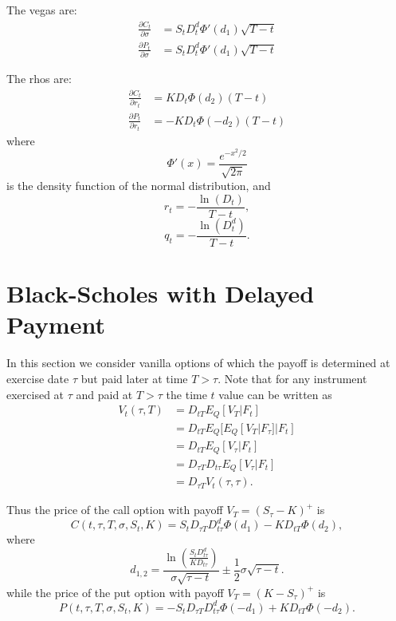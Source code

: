 The vegas are:
\begin{align}
	\frac{\partial C_t}{\partial \sigma} &= S_t D_t^d \Phi'(d_1) \sqrt{T-t}   \\
	\frac{\partial P_t}{\partial \sigma} &= S_t D_t^d \Phi'(d_1) \sqrt{T-t}
\end{align}

The rhos are:
\begin{align}
	\frac{\partial C_t}{\partial r_t} &= K D_t \Phi(d_2) (T-t)    \\
	\frac{\partial P_t}{\partial r_t} &= - K D_t \Phi(-d_2) (T-t)
\end{align}
where
\[
	\Phi'(x)=\frac{e^{-x^2/2}}{\sqrt{2\pi}}
\]
is the density function of the normal distribution,
and
\[
	r_t = -\frac{\ln(D_t)}{T-t},
\]
\[
	q_t = -\frac{\ln(D_t^d)}{T-t}.
\]


\section{Black-Scholes with Delayed Payment}
In this section we consider vanilla options of which the payoff is determined at
exercise date $\tau$ but paid later at time $T>\tau$.
Note that for any instrument exercised at $\tau$ and paid at $T>\tau$
the time $t$ value can be written as
\begin{align*}
	V_t(\tau,T) &= D_{tT} E_Q[V_T|F_t]    \\
				 &= D_{tT} E_Q[E_Q[V_T|F_{\tau}]|F_t]  \\
				 &= D_{tT} E_Q[V_{\tau}|F_t]  \\
				 &= D_{\tau T} D_{t\tau} E_Q[V_{\tau}|F_t]  \\
				 &= D_{\tau T} V_t(\tau,\tau).
\end{align*}

Thus the price of the call option with payoff $V_T=(S_{\tau}-K)^+$ is
\begin{equation} 
	C(t,\tau, T,\sigma,S_t,K) = S_t D_{\tau T} D_{t\tau}^d \Phi(d_1) - K D_{tT} \Phi(d_2),
\end{equation}
where
\[
	d_{1,2}=
  	\frac{\ln\left( \frac{S_t D_{t\tau}^d}{K D_{t\tau}}	\right)}{\sigma\sqrt{\tau-t}}
          \pm \frac{1}{2} \sigma\sqrt{\tau-t}.
\]
while the price of the put option with payoff $V_T=(K-S_{\tau})^+$ is 
\begin{equation}
	P(t,\tau,T,\sigma,S_t,K) = - S_t D_{\tau T} D_{t\tau}^d \Phi(-d_1) + K D_{tT} \Phi(-d_2).
\end{equation}

